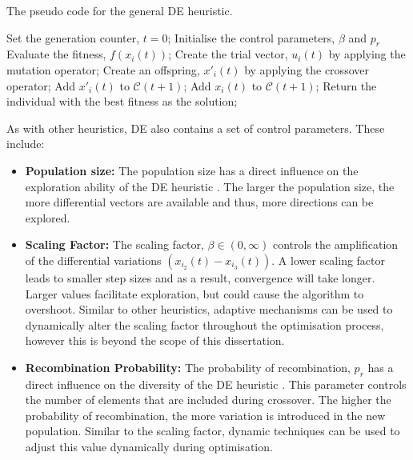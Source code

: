 \begin{algorithm}[H]
    \caption{The pseudo code for the general \ac{DE} heuristic.}
    \label{algo:heuristics:de:general_de}
    \begin{algorithmic}
        \State Set the generation counter, $t = 0$;
        \State Initialise the control parameters, $\beta$ and $p_{r}$
                \State Evaluate the fitness, $f(x_{i}(t))$;
                \State Create the trial vector, $u_{i}(t)$ by applying the mutation operator;
                \State Create an offspring, $x'_{i}(t)$ by applying the crossover operator;
                    \State Add $x'_{i}(t)$ to $\mathcal{C}(t+1)$;
                \Else
                    \State Add $x_{i}(t)$ to $\mathcal{C}(t+1)$;
                \EndIf
            \EndFor
        \EndWhile
        \State Return the individual with the best fitness as the solution;
    \end{algorithmic}
\end{algorithm}

As with other heuristics, \ac{DE} also contains a set of control parameters. These include:

\begin{itemize}
    \item \textbf{Population size:} The population size has a direct influence on the exploration ability of the \ac{DE} heuristic \cite{ref:engelbrecht:2007}. The larger the population size, the more differential vectors are available and thus, more directions can be explored.
    
    \item \textbf{Scaling Factor:} The scaling factor, $\beta \in (0, \infty)$ controls the amplification of the differential variations $(x_{i_{2}}(t) - x_{i_{3}}(t))$. A lower scaling factor leads to smaller step sizes and as a result, convergence will take longer. Larger values facilitate exploration, but could cause the algorithm to overshoot. Similar to other heuristics, adaptive mechanisms can be used to dynamically alter the scaling factor throughout the optimisation process, however this is beyond the scope of this dissertation.
    
    
    \item \textbf{Recombination Probability:} The probability of recombination, $p_{r}$ has a direct influence on the diversity of the \ac{DE} heuristic \cite{ref:engelbrecht:2007}. This parameter controls the number of elements that are included during crossover. The higher the probability of recombination, the more variation is introduced in the new population. Similar to the scaling factor, dynamic techniques can be used to adjust this value dynamically during optimisation.
\end{itemize}

